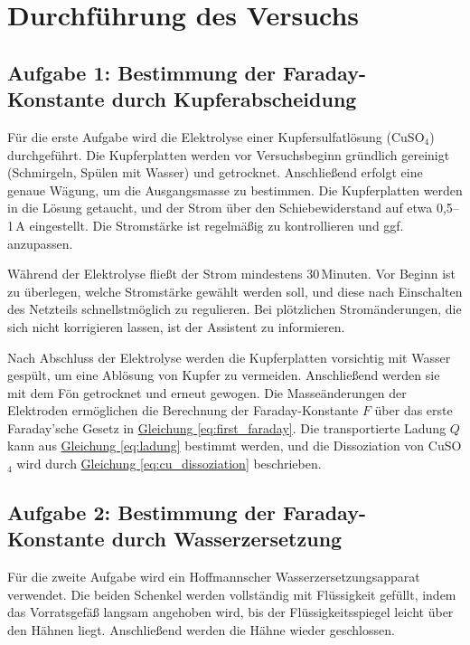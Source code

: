\chapter{Durchführung des Versuchs}

\section*{Aufgabe 1: Bestimmung der Faraday-Konstante durch Kupferabscheidung}
Für die erste Aufgabe wird die Elektrolyse einer Kupfersulfatlösung (CuSO$_4$) durchgeführt. Die Kupferplatten werden vor Versuchsbeginn gründlich gereinigt (Schmirgeln, Spülen mit Wasser) und getrocknet. Anschließend erfolgt eine genaue Wägung, um die Ausgangsmasse zu bestimmen. Die Kupferplatten werden in die Lösung getaucht, und der Strom über den Schiebewiderstand auf etwa 0,5–1\,A eingestellt. Die Stromstärke ist regelmäßig zu kontrollieren und ggf. anzupassen.  

Während der Elektrolyse fließt der Strom mindestens 30\,Minuten. Vor Beginn ist zu überlegen, welche Stromstärke gewählt werden soll, und diese nach Einschalten des Netzteils schnellstmöglich zu regulieren. Bei plötzlichen Stromänderungen, die sich nicht korrigieren lassen, ist der Assistent zu informieren.  

Nach Abschluss der Elektrolyse werden die Kupferplatten vorsichtig mit Wasser gespült, um eine Ablösung von Kupfer zu vermeiden. Anschließend werden sie mit dem Fön getrocknet und erneut gewogen. Die Masseänderungen der Elektroden ermöglichen die Berechnung der Faraday-Konstante $F$ über das erste Faraday’sche Gesetz in \hyperref[eq:first_faraday]{Gleichung \ref*{eq:first_faraday}}. Die transportierte Ladung $Q$ kann aus \hyperref[eq:ladung]{Gleichung \ref*{eq:ladung}} bestimmt werden, und die Dissoziation von CuSO$_4$ wird durch \hyperref[eq:cu_dissoziation]{Gleichung \ref*{eq:cu_dissoziation}} beschrieben.

\section*{Aufgabe 2: Bestimmung der Faraday-Konstante durch Wasserzersetzung}

Für die zweite Aufgabe wird ein Hoffmannscher Wasserzersetzungsapparat verwendet. Die beiden Schenkel werden vollständig mit Flüssigkeit gefüllt, indem das Vorratsgefäß langsam angehoben wird, bis der Flüssigkeitsspiegel leicht über den Hähnen liegt. Anschließend werden die Hähne wieder geschlossen.  

